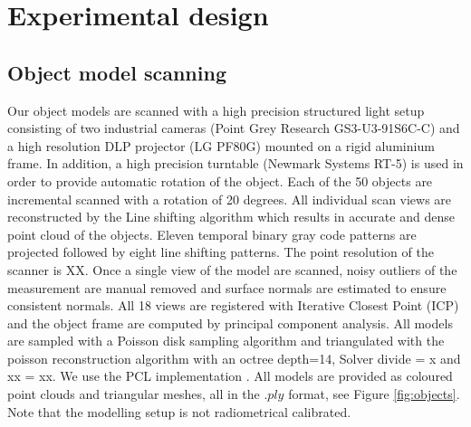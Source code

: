 \documentclass[10pt,twocolumn,letterpaper]{article}
\begin{document}
\section{Experimental design} \label{sec:exp_design}
\subsection{Object model scanning}
Our object models are scanned with a high precision structured light setup consisting of two industrial cameras (Point Grey Research GS3-U3-91S6C-C) and
a high resolution DLP projector (LG PF80G) mounted on a rigid aluminium frame. In addition, a high precision turntable (Newmark Systems RT-5) is used in order to provide automatic rotation of the object. Each of the 50 objects are incremental scanned with a rotation of 20 degrees. All individual scan views are reconstructed by the Line shifting algorithm \cite{Guehring2000} which results in accurate and dense point cloud of the objects. Eleven temporal binary gray code patterns are projected followed by eight line shifting patterns. The point resolution of the scanner is XX. Once a single view of the model are scanned, noisy outliers of the measurement are manual removed and surface normals are estimated to ensure consistent normals. All 18 views are registered with Iterative Closest Point (ICP) and the object frame are computed by principal component analysis.
All models are sampled with a Poisson disk sampling algorithm and triangulated with the poisson reconstruction algorithm \cite{Kazhdan2006} with an octree depth=14, Solver divide = x and xx = xx. We use the PCL implementation \cite{RusuCousins2011}. All models are provided as coloured point clouds and triangular meshes, all in the $.ply$ format, see Figure \ref{fig:objects}. Note that the modelling setup is not radiometrical calibrated.
\end{document}

